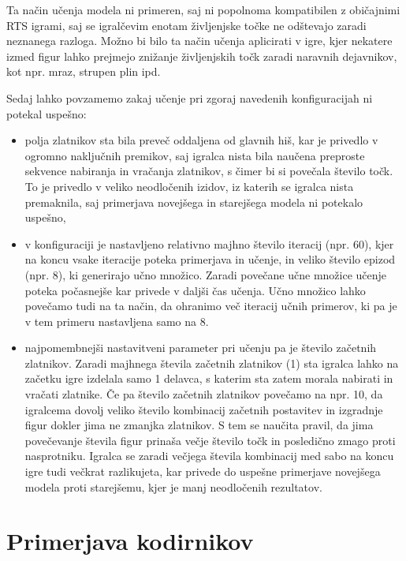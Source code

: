 \documentclass[a4paper, 12pt]{book}
\begin{document}
Ta način učenja modela ni primeren, saj ni popolnoma kompatibilen z običajnimi RTS igrami, saj se igralčevim enotam življenjske točke ne odštevajo zaradi neznanega razloga.
Možno bi bilo ta način učenja aplicirati v igre, kjer nekatere izmed figur lahko prejmejo znižanje življenjskih točk zaradi naravnih dejavnikov, kot npr. mraz, strupen plin ipd.

Sedaj lahko povzamemo zakaj učenje pri zgoraj navedenih konfiguracijah ni potekal uspešno:
\begin{itemize}
	\item polja zlatnikov sta bila preveč oddaljena od glavnih hiš, kar je privedlo v ogromno naključnih premikov, saj igralca nista bila naučena preproste sekvence nabiranja in vračanja zlatnikov, s čimer bi si povečala število točk.
	To je privedlo v veliko neodločenih izidov, iz katerih se igralca nista premaknila, saj primerjava novejšega in starejšega modela ni potekalo uspešno,
	\item v konfiguraciji je nastavljeno relativno majhno število iteracij (npr. 60), kjer na koncu vsake iteracije poteka primerjava in učenje, in veliko število epizod (npr. 8), ki generirajo učno množico.
	Zaradi povečane učne množice učenje poteka počasnejše kar privede v daljši čas učenja. Učno množico lahko povečamo tudi na ta način, da ohranimo več iteracij učnih primerov, ki pa je v tem primeru nastavljena samo na 8.	
	\item najpomembnejši nastavitveni parameter pri učenju pa je število začetnih zlatnikov.
	Zaradi majhnega števila začetnih zlatnikov (1) sta igralca lahko na začetku igre izdelala samo 1 delavca, s katerim sta zatem morala nabirati in vračati zlatnike.
	Če pa število začetnih zlatnikov povečamo na npr. 10, da igralcema dovolj veliko število kombinacij začetnih postavitev in izgradnje figur dokler jima ne zmanjka zlatnikov.
	S tem se naučita pravil, da jima povečevanje števila figur prinaša večje število točk in posledično zmago proti nasprotniku.
	Igralca se zaradi večjega števila kombinacij med sabo na koncu igre tudi večkrat razlikujeta, kar privede do uspešne primerjave novejšega modela proti starejšemu, kjer je manj neodločenih rezultatov.
	
\end{itemize}

\section{Primerjava kodirnikov}
\end{document}
